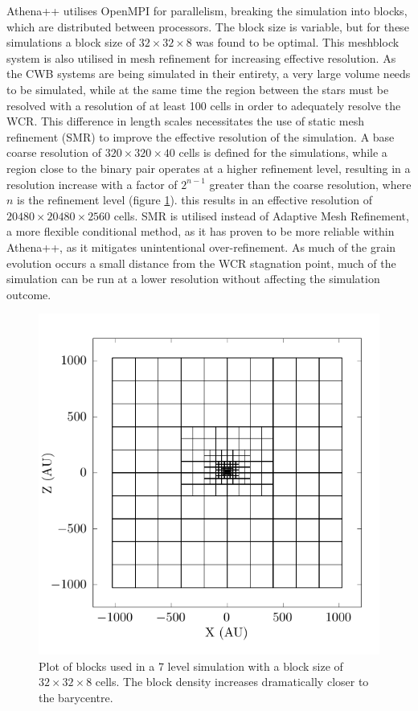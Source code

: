 Athena++ utilises OpenMPI for parallelism, breaking the simulation into blocks, which are distributed between processors.
The block size is variable, but for these simulations a block size of $32\times 32 \times 8$ was found to be optimal.
This meshblock system is also utilised in mesh refinement for increasing effective resolution.
As the CWB systems are being simulated in their entirety, a very large volume needs to be simulated, while at the same time the region between the stars must be resolved with a resolution of at least 100 cells in order to adequately resolve the WCR.
This difference in length scales necessitates the use of static mesh refinement (SMR) to improve the effective resolution of the simulation.
A base coarse resolution of $320 \times 320 \times 40$ cells is defined for the simulations, while a region close to the binary pair operates at a higher refinement level, resulting in a resolution increase with a factor of $2^{n-1}$ greater than the coarse resolution, where $n$ is the refinement level (figure \ref{fig:smr-grid}).
this results in an effective resolution of $20480 \times 20480 \times 2560$ cells.
SMR is utilised instead of Adaptive Mesh Refinement, a more flexible conditional method, as it has proven to be more reliable within Athena++, as it mitigates unintentional over-refinement.
As much of the grain evolution occurs a small distance from the WCR stagnation point, much of the simulation can be run at a lower resolution without affecting the simulation outcome.

\begin{figure}
  \centering
  \includegraphics{assets/mesh/gridxy.pdf}
  \caption[Static mesh refinement example]{Plot of blocks used in a 7 level simulation with a block size of $32\times 32 \times 8$ cells. The block density increases dramatically closer to the barycentre.}
  \label{fig:smr-grid}
\end{figure}

